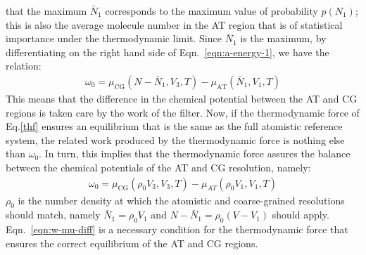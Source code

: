 \documentclass[aip,jcp,a4paper,reprint,onecolumn]{revtex4-1}
\newcommand{\AT}{{\textrm{{AT}}}}
\newcommand{\CG}{{\textrm{CG}}}
\begin{document}
that the maximum $\bar N_1$ corresponds to the maximum
value of probability $p(N_1)$; this is also the average molecule
number in the AT region that is of statistical importance
under the thermodynamic limit.  Since $\bar
N_1$ is the maximum, by differentiating on the right hand side of
Eqn.~\eqref{eqn:a-energy-1}, we have the relation:
\begin{align}
  \omega_0 = \mu_{\CG}(N - \bar N_1, V_3, T)  - \mu_{\AT}(\bar N_1, V_1, T)
\end{align}
This means that the difference in the chemical potential between the AT and CG
regions is taken care by the work of the filter.
Now, if the thermodynamic force of Eq.\ref{thf} ensures an
equilibrium that is the same as the full atomistic reference system,
the related work produced by the thermodynamic force is nothing else than $\omega_0 $.
In turn, this implies that the thermodynamic force assures the balance between the chemical potentials of the AT and CG resolution,
namely:
\begin{align}\label{eqn:w-mu-diff}
  \omega_0 = \mu_{\CG}(\rho_0V_3, V_3, T) - \mu_{AT}(\rho_0 V_1, V_1, T)
\end{align}
$\rho_0$ is the number density at which the atomistic and coarse-grained
resolutions should match,
namely $\bar N_1 = \rho_0V_1$ and $N - \bar N_1 = \rho_0(V - V_1)$ should apply.
Eqn.~\eqref{eqn:w-mu-diff} is a necessary
condition for the thermodynamic force that ensures
the correct equilibrium of the AT and CG regions.\\
\end{document}
